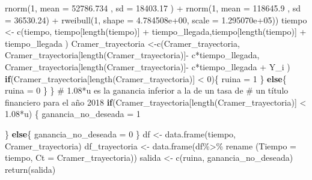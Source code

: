 \documentclass[
  us-letterpaper,
]{scrreprt}
\newenvironment{Shaded}{\begin{snugshade}}{\end{snugshade}}
\newcommand{\AttributeTok}[1]{\textcolor[rgb]{0.40,0.45,0.13}{#1}}
\newcommand{\CommentTok}[1]{\textcolor[rgb]{0.37,0.37,0.37}{#1}}
\newcommand{\ControlFlowTok}[1]{\textcolor[rgb]{0.00,0.23,0.31}{\textbf{#1}}}
\newcommand{\DecValTok}[1]{\textcolor[rgb]{0.68,0.00,0.00}{#1}}
\newcommand{\FloatTok}[1]{\textcolor[rgb]{0.68,0.00,0.00}{#1}}
\newcommand{\FunctionTok}[1]{\textcolor[rgb]{0.28,0.35,0.67}{#1}}
\newcommand{\NormalTok}[1]{\textcolor[rgb]{0.00,0.23,0.31}{#1}}
\newcommand{\OtherTok}[1]{\textcolor[rgb]{0.00,0.23,0.31}{#1}}
\newcommand{\SpecialCharTok}[1]{\textcolor[rgb]{0.37,0.37,0.37}{#1}}
\theoremstyle{definition}
\theoremstyle{plain}
\theoremstyle{plain}
\theoremstyle{remark}
\begin{document}
\begin{Shaded}
\begin{Highlighting}[]
             \FunctionTok{rnorm}\NormalTok{(}\DecValTok{1}\NormalTok{, }\AttributeTok{mean =} \FloatTok{52786.734}\NormalTok{  , }\AttributeTok{sd =} \FloatTok{18403.17}\NormalTok{ ) }\SpecialCharTok{+}
             \FunctionTok{rnorm}\NormalTok{(}\DecValTok{1}\NormalTok{, }\AttributeTok{mean =} \FloatTok{118645.9}\NormalTok{  , }\AttributeTok{sd =} \FloatTok{36530.24}\NormalTok{)   }\SpecialCharTok{+} 
             \FunctionTok{rweibull}\NormalTok{(}\DecValTok{1}\NormalTok{,  }\AttributeTok{shape =} \FloatTok{4.784508e+00}\NormalTok{, }\AttributeTok{scale =} \FloatTok{1.295070e+05}\NormalTok{)) }
\NormalTok{    tiempo }\OtherTok{\textless{}{-}} \FunctionTok{c}\NormalTok{(tiempo, tiempo[}\FunctionTok{length}\NormalTok{(tiempo)] }\SpecialCharTok{+}
\NormalTok{                  tiempo\_llegada,tiempo[}\FunctionTok{length}\NormalTok{(tiempo)] }\SpecialCharTok{+} 
\NormalTok{                  tiempo\_llegada ) }
\NormalTok{    Cramer\_trayectoria }\OtherTok{\textless{}{-}}\FunctionTok{c}\NormalTok{(Cramer\_trayectoria,}
\NormalTok{                Cramer\_trayectoria[}\FunctionTok{length}\NormalTok{(Cramer\_trayectoria)]}\SpecialCharTok{{-}}
\NormalTok{                             c}\SpecialCharTok{*}\NormalTok{tiempo\_llegada,}
\NormalTok{                Cramer\_trayectoria[}\FunctionTok{length}\NormalTok{(Cramer\_trayectoria)]}\SpecialCharTok{{-}}
\NormalTok{                             c}\SpecialCharTok{*}\NormalTok{tiempo\_llegada }\SpecialCharTok{+}\NormalTok{  Y\_i )}
    \ControlFlowTok{if}\NormalTok{(Cramer\_trayectoria[}\FunctionTok{length}\NormalTok{(Cramer\_trayectoria)] }\SpecialCharTok{\textless{}} \DecValTok{0}\NormalTok{)\{}
\NormalTok{      ruina }\OtherTok{=} \DecValTok{1}
\NormalTok{    \}}
    \ControlFlowTok{else}\NormalTok{\{}
\NormalTok{      ruina }\OtherTok{=} \DecValTok{0}
\NormalTok{    \}}
\NormalTok{  \}}
\CommentTok{\# 1.08*u es la ganancia inferior a la de un tasa de}
\CommentTok{\# un título financiero para el año 2018}
  \ControlFlowTok{if}\NormalTok{(Cramer\_trayectoria[}\FunctionTok{length}\NormalTok{(Cramer\_trayectoria)] }\SpecialCharTok{\textless{}} \FloatTok{1.08}\SpecialCharTok{*}\NormalTok{u) \{}
\NormalTok{    ganancia\_no\_deseada }\OtherTok{=} \DecValTok{1}
    
\NormalTok{  \} }
  \ControlFlowTok{else}\NormalTok{\{}
\NormalTok{    ganancia\_no\_deseada }\OtherTok{=} \DecValTok{0}
\NormalTok{  \}}
\NormalTok{  df }\OtherTok{\textless{}{-}} \FunctionTok{data.frame}\NormalTok{(tiempo, Cramer\_trayectoria)}
\NormalTok{  df\_trayectoria }\OtherTok{\textless{}{-}} \FunctionTok{data.frame}\NormalTok{(df}\SpecialCharTok{\%\textgreater{}\%}\NormalTok{ rename}
\NormalTok{                               (}\AttributeTok{Tiempo =}\NormalTok{ tiempo, }
                                 \AttributeTok{Ct =}\NormalTok{ Cramer\_trayectoria))}
\NormalTok{  salida }\OtherTok{\textless{}{-}} \FunctionTok{c}\NormalTok{(ruina, ganancia\_no\_deseada)}
  \FunctionTok{return}\NormalTok{(salida)}
  

\end{Highlighting}
\end{Shaded}
\end{document}
